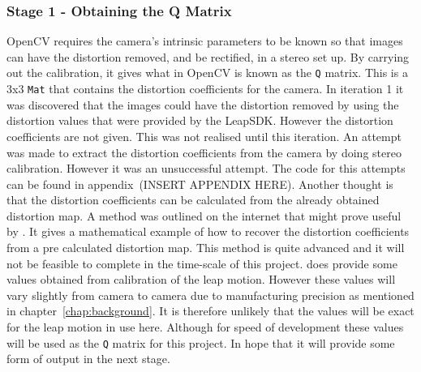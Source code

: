 \documentclass[11pt,oneside]{report}
\newcommand\code[1]{\texttt{#1}}
\begin{document}
		\subsubsection{Stage 1 - Obtaining the Q Matrix}
			OpenCV requires the camera's intrinsic parameters to be known so that images can have the distortion removed, and be rectified, in a stereo set up.
			By carrying out the calibration, it gives what in OpenCV is known as the \code{Q} matrix.
			This is a 3x3 \code{Mat} that contains the distortion coefficients for the camera.
			In iteration 1 it was discovered that the images could have the distortion removed by using the distortion values that were provided by the LeapSDK.
			However the distortion coefficients are not given.
			This was not realised until this iteration.
			An attempt was made to extract the distortion coefficients from the camera by doing stereo calibration.
			However it was an unsuccessful attempt.
			The code for this attempts can be found in appendix~(INSERT APPENDIX HERE).
			Another thought is that the distortion coefficients can be calculated from the already obtained distortion map.
			A method was outlined on the internet that might prove useful by .
			It gives a mathematical example of how to recover the distortion coefficients from a pre calculated distortion map.
			This method is quite advanced and it will not be feasible to complete in the time-scale of this project.
			 does provide some values obtained from calibration of the leap motion.
			However these values will vary slightly from camera to camera due to manufacturing precision as mentioned in chapter~\ref{chap:background}.
			It is therefore unlikely that the values will be exact for the leap motion in use here.
			Although for speed of development these values will be used as the \code{Q} matrix for this project.
			In hope that it will provide some form of output in the next stage.
\end{document}
